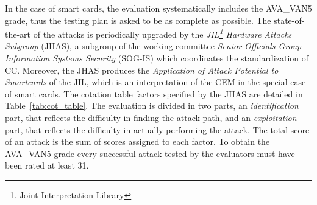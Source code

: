 In the case of smart cards, the evaluation systematically includes the AVA\_VAN5 grade, thus the testing plan is asked to be as complete as possible. The state-of-the-art of the attacks is periodically upgraded by the \emph{JIL\footnote{Joint Interpretation Library} Hardware Attacks Subgroup} (JHAS), a subgroup of the working committee \emph{Senior Officials Group Information Systems Security} (SOG-IS) which coordinates the standardization of CC. Moreover, the JHAS produces the \emph{Application of Attack Potential to Smartcards} \cite{JIL} of the JIL, which is an interpretation of the CEM in the special case of smart cards. The cotation table factors specified by the JHAS are detailed in Table~\ref{tab:cot_table}. The evaluation is divided in two parts, an \emph{identification} part, that reflects the difficulty in finding the attack path, and an \emph{exploitation} part, that reflects the difficulty in actually performing the attack. The total score of an attack is the sum of scores assigned to each factor. To obtain the AVA\_VAN5 grade every successful attack tested by the evaluators must have been rated at least 31.\\



